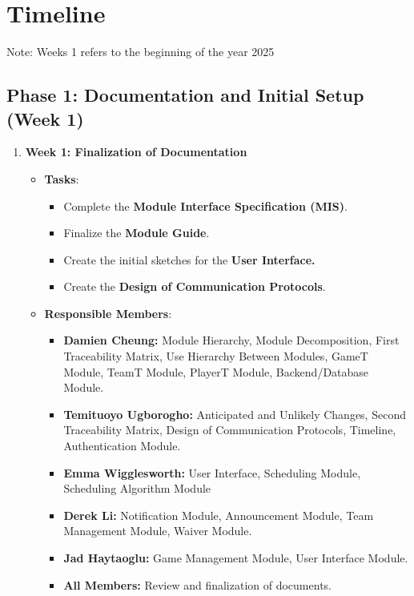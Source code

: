 \documentclass[12pt, titlepage]{article}
\begin{document}

\section{Timeline}

Note: Weeks 1 refers to the beginning of the year 2025

\subsection*{Phase 1: Documentation and Initial Setup (Week 1)}

\begin{enumerate}
    \item \textbf{Week 1: Finalization of Documentation}
    \begin{itemize}
        \item \textbf{Tasks}:
        \begin{itemize}
            \item Complete the \textbf{Module Interface Specification (MIS)}.
            \item Finalize the \textbf{Module Guide}.
            \item Create the initial sketches for the \textbf{User Interface.}
            \item Create the \textbf{Design of Communication Protocols}.
        \end{itemize}
        \item \textbf{Responsible Members}:
        \begin{itemize}
            \item \textbf{Damien Cheung:} Module Hierarchy, Module Decomposition, First Traceability Matrix, Use Hierarchy Between Modules,
            GameT Module, TeamT Module, PlayerT Module, Backend/Database Module.
            \item \textbf{Temituoyo Ugborogho:} Anticipated and Unlikely Changes, Second Traceability Matrix, Design of Communication Protocols,
            Timeline, Authentication Module.
            \item \textbf{Emma Wigglesworth:} User Interface, Scheduling Module, Scheduling Algorithm Module
            \item \textbf{Derek Li:} Notification Module, Announcement Module, Team Management Module, Waiver Module.
            \item \textbf{Jad Haytaoglu:} Game Management Module, User Interface Module.
            \item \textbf{All Members:} Review and finalization of documents.
        \end{itemize}
    \end{itemize}
\end{enumerate}
\end{document}
